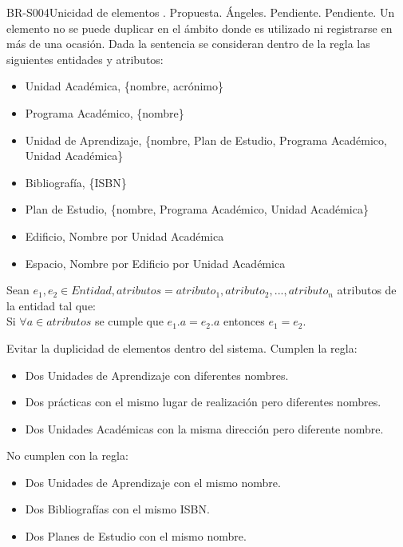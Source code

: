 \begin{BusinessRule}{BR-S004}{Unicidad de elementos}
	{\bcIntegridad}    %
	{\btEnabler}     %
	{\blControlling}    %
	.
	\BRItem[Estado] Propuesta.
	 Ángeles.
	 Pendiente.
	 Pendiente.
	\BRItem[Descripción] Un elemento no se puede duplicar en el ámbito donde es utilizado ni registrarse en más de una ocasión. Dada la sentencia se consideran dentro de la regla las siguientes entidades y atributos:
	
	\begin{itemize}
		\item Unidad Académica, \{nombre, acrónimo\}
		\item Programa Académico, \{nombre\}
		\item Unidad de Aprendizaje, \{nombre, Plan de Estudio, Programa Académico, Unidad Académica\}
		\item Bibliografía, \{ISBN\}
		\item Plan de Estudio, \{nombre, Programa Académico, Unidad Académica\}
		\item Edificio, {Nombre por Unidad Académica}
		\item Espacio, {Nombre por Edificio por Unidad Académica}

	\end{itemize}
	\BRItem[Sentencia] Sean $ e_1, e_2 \in Entidad , atributos = {atributo_1, atributo_2,...,atributo_n}$ atributos de la entidad tal que:\\
	Si $ \forall a \in atributos$ se cumple que $ e_1.a = e_2.a$ entonces $ e_1 = e_2 $.
	
	\BRItem[Motivación] Evitar la duplicidad de elementos dentro del sistema.
	 Cumplen la regla:
	\begin{itemize}
		\item Dos Unidades de Aprendizaje con diferentes nombres.
		\item Dos prácticas con el mismo lugar de realización pero diferentes nombres.
		\item Dos Unidades Académicas con la misma dirección pero diferente nombre.
	\end{itemize}
	 No cumplen con la regla:
	\begin{itemize}
		\item Dos Unidades de Aprendizaje con el mismo nombre.
		\item Dos Bibliografías con el mismo ISBN.
		\item Dos Planes de Estudio con el mismo nombre.
	\end{itemize}
\end{BusinessRule}

